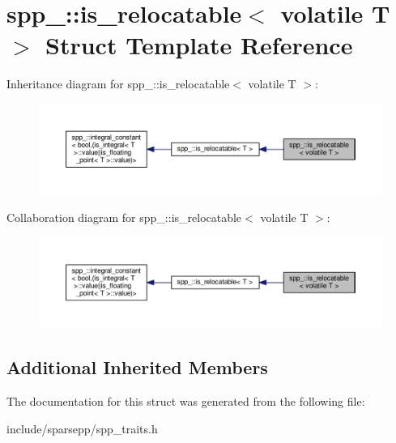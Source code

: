 \hypertarget{structspp___1_1is__relocatable_3_01volatile_01_t_01_4}{}\section{spp\+\_\+\+:\+:is\+\_\+relocatable$<$ volatile T $>$ Struct Template Reference}
\label{structspp___1_1is__relocatable_3_01volatile_01_t_01_4}


Inheritance diagram for spp\+\_\+\+:\+:is\+\_\+relocatable$<$ volatile T $>$\+:\nopagebreak
\begin{figure}[H]
\begin{center}
\leavevmode
\includegraphics[width=350pt]{structspp___1_1is__relocatable_3_01volatile_01_t_01_4__inherit__graph}
\end{center}
\end{figure}


Collaboration diagram for spp\+\_\+\+:\+:is\+\_\+relocatable$<$ volatile T $>$\+:\nopagebreak
\begin{figure}[H]
\begin{center}
\leavevmode
\includegraphics[width=350pt]{structspp___1_1is__relocatable_3_01volatile_01_t_01_4__coll__graph}
\end{center}
\end{figure}
\subsection*{Additional Inherited Members}


The documentation for this struct was generated from the following file\+:\begin{DoxyCompactItemize}
\item 
include/sparsepp/spp\+\_\+traits.\+h\end{DoxyCompactItemize}
